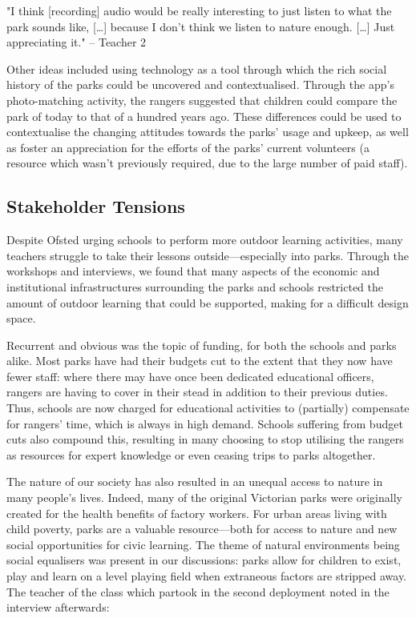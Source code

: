 \begin{displayquote}
"I think [recording] audio would be really interesting to just listen to what the park sounds like, […] because I don't think we listen to nature enough. […] Just appreciating it." – Teacher 2
\end{displayquote}

Other ideas included using technology as a tool through which the rich social history of the parks could be uncovered and contextualised. Through the app’s photo-matching activity, the rangers suggested that children could compare the park of today to that of a hundred years ago. These differences could be used to contextualise the changing attitudes towards the parks’ usage and upkeep, as well as foster an appreciation for the efforts of the parks’ current volunteers (a resource which wasn't previously required, due to the large number of paid staff).

\subsection{Stakeholder Tensions}

Despite Ofsted urging schools to perform more outdoor learning activities, many teachers struggle to take their lessons outside—especially into parks. Through the workshops and interviews, we found that many aspects of the economic and institutional infrastructures surrounding the parks and schools restricted the amount of outdoor learning that could be supported, making for a difficult design space.

Recurrent and obvious was the topic of funding, for both the schools and parks alike. Most parks have had their budgets cut to the extent that they now have fewer staff: where there may have once been dedicated educational officers, rangers are having to cover in their stead in addition to their previous duties. Thus, schools are now charged for educational activities to (partially) compensate for rangers’ time, which is always in high demand. Schools suffering from budget cuts also compound this, resulting in many choosing to stop utilising the rangers as resources for expert knowledge or even ceasing trips to parks altogether.

The nature of our society has also resulted in an unequal access to nature in many people’s lives. Indeed, many of the original Victorian parks were originally created for the health benefits of factory workers. For urban areas living with child poverty, parks are a valuable resource—both for access to nature and new social opportunities for civic learning. The theme of natural environments being social equalisers was present in our discussions: parks allow for children to exist, play and learn on a level playing field when extraneous factors are stripped away. The teacher of the class which partook in the second deployment noted in the interview afterwards:

